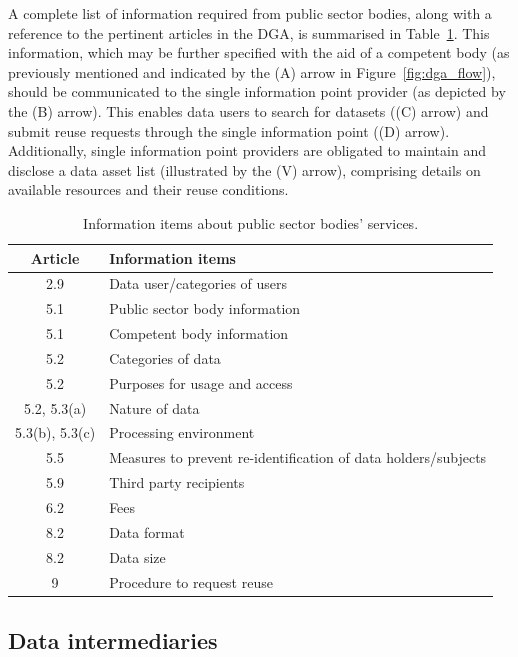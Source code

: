 A complete list of information required from public sector bodies, along with a reference to the pertinent articles in the DGA, is summarised in Table~\ref{tab:conditions_public_data}.
This information, which may be further specified with the aid of a competent body (as previously mentioned and indicated by the (A) arrow in Figure~\ref{fig:dga_flow}), should be communicated to the single information point provider (as depicted by the (B) arrow).
This enables data users to search for datasets ((C) arrow) and submit reuse requests through the single information point ((D) arrow). 
Additionally, single information point providers are obligated to maintain and disclose a data asset list (illustrated by the (V) arrow), comprising details on available resources and their reuse conditions.

\begin{table}[ht]
\centering
\caption{Information items about public sector bodies' services.}
\label{tab:conditions_public_data}
\begin{tabular}{c||l}
\textbf{Article} & \multicolumn{1}{l}{\textbf{Information items}}\\ \hline\hline
2.9 & Data user/categories of users \\ \hline
5.1 & Public sector body information \\ \hline
5.1 & Competent body information \\ \hline
5.2 & Categories of data \\ \hline
5.2 & Purposes for usage and access \\ \hline
5.2, 5.3(a) & Nature of data \\ \hline
5.3(b), 5.3(c) & Processing environment \\ \hline
5.5 & Measures to prevent re-identification of data holders/subjects \\ \hline
5.9 & Third party recipients \\ \hline
6.2 & Fees \\ \hline
8.2 & Data format \\ \hline
8.2 & Data size \\ \hline
9 & Procedure to request reuse
\end{tabular}
\end{table}

\subsection{Data intermediaries}
\label{sec:intermediation}

